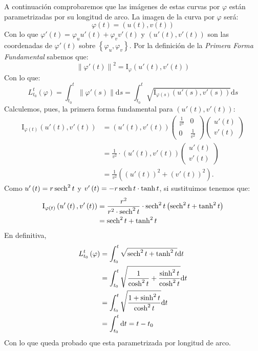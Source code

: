 A continuación comprobaremos que las imágenes de estas curvas por $\varphi$
están parametrizadas por su longitud de arco. La imagen de la curva por
$\varphi$ será:
\[
\varphi\left( t \right) = \left( u\left( t \right), v \left( t \right) \right)
\]
Con lo que $\varphi'\left( t \right) = \varphi_u u'\left( t \right) + \varphi_v
v'\left( t \right)$ y $\left( u'\left( t \right), v'\left( t \right) \right)$
son las coordenadas de $\varphi'\left( t \right)$ sobre $\left\{ \varphi_u,
\varphi_v \right\}$. Por la definición de la \textit{Primera Forma Fundamental}
sabemos que:
\[
\left\lVert \varphi'\left( t \right) \right\rVert^2 = \mathrm{I}_{\varphi}
\left( u'\left( t \right), v'\left( t \right) \right)
\]
Con lo que:
\[
L_{t_0}^t \left( \varphi \right) = \int_{t_0}^{t} \left\lVert \varphi'\left( s
\right) \right\rVert \mathrm{d}s = \int_{t_0}^{t}
\sqrt{\mathrm{I}_{\varphi\left( s \right)} \left( u'\left( s \right), v'\left( s
\right) \right)} \mathrm{d}s
\]
Calculemos, pues, la primera forma fundamental para $\left( u'\left( t \right),
v'\left( t \right) \right)$:
\begin{align*}
\mathrm{I}_{\varphi\left( t \right)}\left( u'\left( t \right), v'\left( t
\right) \right) &= \left( u'\left( t \right), v'\left( t \right) \right)
\begin{pmatrix} \frac{1}{v^2} & 0\\ 0 & \frac{1}{v^2} \end{pmatrix}
\begin{pmatrix} u'\left( t \right)\\ v'\left( t \right) \end{pmatrix}\\ 
&= \frac{1}{v^2} \cdot \left( u'\left( t \right), v'\left( t \right) \right) \begin{pmatrix} u'\left( t \right)\\ v'\left( t \right) \end{pmatrix}\\
&= \frac{1}{v^2} \left( \left( u'\left( t \right) \right)^2 + \left( v'\left( t
\right) \right)^2 \right).
\end{align*}
Como $u'\left( t \right) = r \operatorname{sech}^2 t$ y $v'\left( t \right) = -r \operatorname{sech} t
\cdot \tanh t$, si sustituimos tenemos que:
\begin{align*}
\mathrm{I}_{\varphi\left( t \right)}\left( u'\left( t \right), v'\left( t
\right) \right) &= \frac{r^2}{r^2 \cdot \operatorname{sech}^2 t} \cdot \operatorname{sech}^2 t \left( \operatorname{sech}^2 t + \tanh^2 t
\right)\\
&= \operatorname{sech}^2 t + \tanh^2 t
\end{align*}
En definitiva,
\begin{align*}
L_{t_0}^t \left( \varphi \right) &= \int_{t_0}^{t} \sqrt{\operatorname{sech}^2 t + \tanh^2
t} \mathrm{d}t\\
&= \int_{t_0}^{t} \sqrt{\frac{1}{\cosh^2 t} + \frac{\sinh^2 t}{\cosh^2 t}}
\mathrm{d}t\\
&= \int_{t_0}^{t} \sqrt{\frac{1 + \sinh^2 t}{\cosh^2 t}} \mathrm{d}t\\
&= \int_{t_0}^{t}  \mathrm{d}t= t - t_0
\end{align*}
Con lo que queda probado que esta parametrizada por longitud de arco.
